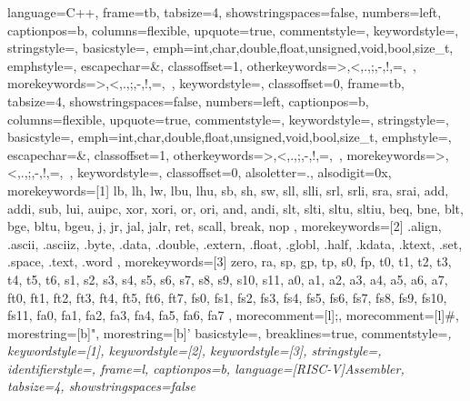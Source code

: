 {
    language=C++,
    frame=tb,
    tabsize=4,
    showstringspaces=false,
    numbers=left,
    captionpos=b,
    columns=flexible,
    upquote=true,
    commentstyle=\color{commentgreen},
    keywordstyle=\color{blue},
    stringstyle=\color{commentgreen},
    basicstyle=\small\ttfamily,
    emph={int,char,double,float,unsigned,void,bool,size\_t},
    emphstyle={\color{blue}},
    escapechar=\&,
    classoffset=1,
    otherkeywords={>,<,.,;,-,!,=,~},
    morekeywords={>,<,.,;,-,!,=,~},
    keywordstyle=\color{black},
    classoffset=0,
}
 {
    frame=tb,
    tabsize=4,
    showstringspaces=false,
    numbers=left,
    captionpos=b,
    columns=flexible,
    upquote=true,
    commentstyle=\color{black},
    keywordstyle=\color{black},
    stringstyle=\color{black},
    basicstyle=\small\ttfamily,
    emph={int,char,double,float,unsigned,void,bool,size\_t},
    emphstyle={\color{black}},
    escapechar=\&,
    classoffset=1,
    otherkeywords={>,<,.,;,-,!,=,~},
    morekeywords={>,<,.,;,-,!,=,~},
    keywordstyle=\color{black},
    classoffset=0,
}
{
    alsoletter={.}, %
    alsodigit={0x}, %
    morekeywords=[1]{ %
    lb, lh, lw, lbu, lhu,
    sb, sh, sw,
    sll, slli, srl, srli, sra, srai,
    add, addi, sub, lui, auipc,
    xor, xori, or, ori, and, andi,
    slt, slti, sltu, sltiu,
    beq, bne, blt, bge, bltu, bgeu,
    j, jr, jal, jalr, ret,
    scall, break, nop
},
    morekeywords=[2]{ %
    .align, .ascii, .asciiz, .byte, .data, .double, .extern,
    .float, .globl, .half, .kdata, .ktext, .set, .space, .text, .word
},
    morekeywords=[3]{ %
    zero, ra, sp, gp, tp, s0, fp,
    t0, t1, t2, t3, t4, t5, t6,
    s1, s2, s3, s4, s5, s6, s7, s8, s9, s10, s11,
    a0, a1, a2, a3, a4, a5, a6, a7,
    ft0, ft1, ft2, ft3, ft4, ft5, ft6, ft7,
    fs0, fs1, fs2, fs3, fs4, fs5, fs6, fs7, fs8, fs9, fs10, fs11,
    fa0, fa1, fa2, fa3, fa4, fa5, fa6, fa7
},
    morecomment=[l]{;},   %
    morecomment=[l]{\#},  %
    morestring=[b]",      %
    morestring=[b]'       %
}
 {
    basicstyle=\small\ttfamily,                    %
    breaklines=true,                              %
    commentstyle=\itshape\color{green!50!black},  %
    keywordstyle=[1]\color{blue!80!black},        %
    keywordstyle=[2]\color{orange!80!black},      %
    keywordstyle=[3]\color{red!50!black},         %
    stringstyle=\color{mauve},                    %
    identifierstyle=\color{teal},                 %
    frame=l,                                      %
    captionpos=b,
    language=[RISC-V]Assembler,                   %
    tabsize=4,                                    %
    showstringspaces=false                        %
}

\usepackage[normalem]{ulem} %
\useunder{\uline}{\ul}{}    %
\usepackage[colorlinks,urlcolor=blue,filecolor=blue,citecolor=blue,linkcolor = blue,unicode=true]{hyperref}

\usepackage{subfiles}